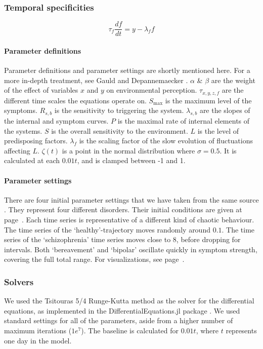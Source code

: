 \documentclass[utf8]{FrontiersinVancouver}
\begin{document}
\subsubsection{Temporal specificities}
\begin{equation}
    \tau_f\frac{df}{dt} = y - \lambda_f f
\end{equation}

\paragraph{Parameter definitions}
Parameter definitions and parameter settings are shortly mentioned here. For a more in-depth treatment, see Gauld and Depannemaecker \citep{gauldDynamicalSystemsComputational2023}. $\alpha$ \& $\beta$ are the weight of the effect of variables $x$ and $y$ on environmental perception. $\tau_{x,y,z,f}$ are the different time scales the equations operate on. $S_{\max}$ is the maximum level of the symptoms. $R_{s, b}$ is the sensitivity to triggering the system.  $\lambda_{s,b}$ are the slopes of the internal and symptom curves. $P$ is the maximal rate of internal elements of the systems. $S$ is the overall sensitivity to the environment. $L$ is the level of predisposing factors. $\lambda_{f}$ is the scaling factor of the slow evolution of fluctuations affecting $L$. $\zeta(t)$ is a point in the normal distribution where $\sigma = 0.5$. It is calculated at each $0.01t$, and is clamped between -1 and 1. 

\paragraph{Parameter settings}
There are four initial parameter settings that we have taken from the same source \citep{gauldDynamicalSystemsComputational2023}. They represent four different disorders. Their initial conditions are given at page~\pageref{tab:1}. Each time series is representative of a different kind of chaotic behaviour. The time series of the `healthy'-trajectory moves randomly around $0.1$. The time series of the `schizophrenia' time series moves close to 8, before dropping for intervals. Both `bereavement' and `bipolar' oscillate quickly in symptom strength, covering the full total range. For visualizations, see page~\pageref{fig:1}. 

\subsubsection{Solvers}
We used the Tsitouras 5/4 Runge-Kutta method as the solver for the differential equations, as implemented in the DifferentialEquations.jl package \citep{tsitourasRungeKuttaPairs2011}. We used standard settings for all of the parameters, aside from a higher number of maximum iterations ($1e^{7}$). The baseline is calculated for $0.01t$, where $t$ represents one day in the model. 
\end{document}
